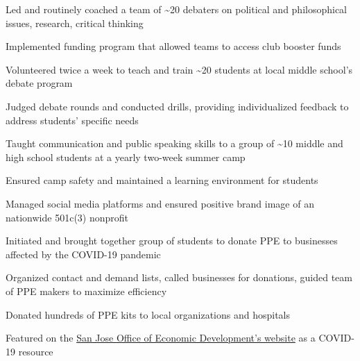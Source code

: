 \documentclass[letterpaper]{resume-shreeram}
\begin{document}
\begin{compactitem}
    \item Led and routinely coached a team of \textasciitilde{}20 debaters on
      political and philosophical issues, research, critical thinking

    \item Implemented funding program that allowed teams to access club booster
      funds
\end{compactitem}

\begin{compactitem}
    \item Volunteered twice a week to teach and train
      \textasciitilde{}20 students at local middle school's debate
      program

    \item Judged debate rounds and conducted drills, providing
      individualized feedback to address students' specific needs
\end{compactitem}

\begin{compactitem}
    \item Taught communication and public speaking skills to a group of
      \textasciitilde{}10 middle and high school students at a yearly
      two-week summer camp

    \item Ensured camp safety and maintained a learning environment for
      students
\end{compactitem}

\begin{compactitem}
    \item Managed social media platforms and ensured positive brand
      image of an nationwide 501c(3) nonprofit
\end{compactitem}

\begin{compactitem}
    \item Initiated and brought together group of students to donate PPE
      to businesses affected by the COVID-19 pandemic

    \item Organized contact and demand lists, called businesses for
      donations, guided team of PPE makers to maximize efficiency

    \item Donated hundreds of PPE kits to local organizations and
      hospitals

    \item Featured on the
      \href{https://www.sjeconomy.com/why-san-jose/covid-19-guidance/local-suppliers}{San
      Jose Office of Economic Development's website} as a COVID-19
      resource
\end{compactitem}
\end{document}
